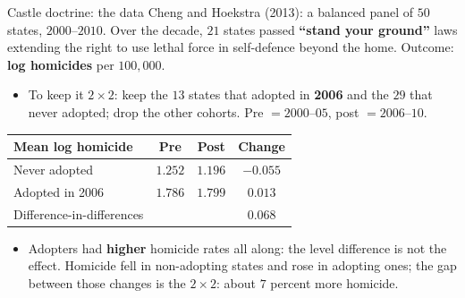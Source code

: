\documentclass[
  11pt,
  ignorenonframetext,
  aspectratio=169,
]{beamer}
\providecommand{\tightlist}{%
  \setlength{\itemsep}{0pt}\setlength{\parskip}{0pt}}
\begin{document}
\begin{frame}{Castle doctrine: the data}
\protect{}\label{castle-doctrine-the-data}
Cheng and Hoekstra (2013): a balanced panel of \(50\) states,
\(2000\)--\(2010\). Over the decade, \(21\) states passed
\textbf{``stand your ground''} laws extending the right to use lethal
force in self-defence beyond the home. Outcome: \textbf{log homicides}
per \(100{,}000\).

\begin{itemize}
\tightlist
\item
  To keep it \(2 \times 2\): keep the \(13\) states that adopted in
  \textbf{2006} and the \(29\) that never adopted; drop the other
  cohorts. Pre \(= 2000\)--\(05\), post \(= 2006\)--\(10\).
\end{itemize}

\begin{center}\small
\begin{tabular}{lccc}
\toprule
Mean log homicide & Pre & Post & Change \\
\midrule
Never adopted & $1.252$ & $1.196$ & $-0.055$ \\
Adopted in 2006 & $1.786$ & $1.799$ & $0.013$ \\
\midrule
Difference-in-differences & & & $\mathbf{0.068}$ \\
\bottomrule
\end{tabular}
\end{center}

\begin{itemize}
\tightlist
\item
  Adopters had \textbf{higher} homicide rates all along: the level
  difference is not the effect. Homicide fell in non-adopting states and
  rose in adopting ones; the gap between those changes is the
  \(2 \times 2\): about \(7\) percent more homicide.
\end{itemize}
\end{frame}
\end{document}
